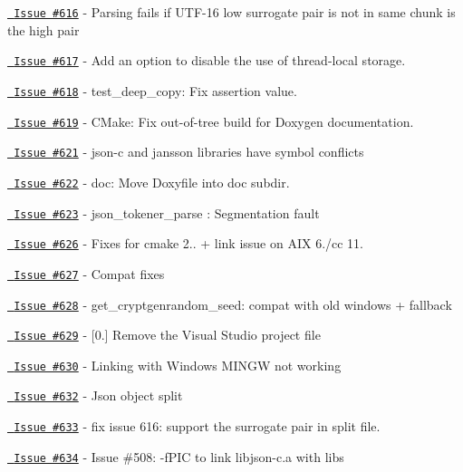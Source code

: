 \begin{DoxyItemize}
\item \href{https://github.com/json-c/json-c/issues/616}{\texttt{ Issue \#616}} -\/ Parsing fails if UTF-\/16 low surrogate pair is not in same chunk is the high pair
\item \href{https://github.com/json-c/json-c/issues/617}{\texttt{ Issue \#617}} -\/ Add an option to disable the use of thread-\/local storage.
\item \href{https://github.com/json-c/json-c/issues/618}{\texttt{ Issue \#618}} -\/ test\+\_\+deep\+\_\+copy\+: Fix assertion value.
\item \href{https://github.com/json-c/json-c/issues/619}{\texttt{ Issue \#619}} -\/ CMake\+: Fix out-\/of-\/tree build for Doxygen documentation.
\item \href{https://github.com/json-c/json-c/issues/621}{\texttt{ Issue \#621}} -\/ json-\/c and jansson libraries have symbol conflicts
\item \href{https://github.com/json-c/json-c/issues/622}{\texttt{ Issue \#622}} -\/ doc\+: Move Doxyfile into doc subdir.
\item \href{https://github.com/json-c/json-c/issues/623}{\texttt{ Issue \#623}} -\/ json\+\_\+tokener\+\_\+parse \+: Segmentation fault
\item \href{https://github.com/json-c/json-c/issues/626}{\texttt{ Issue \#626}} -\/ Fixes for cmake 2.. + link issue on AIX 6./cc 11.
\item \href{https://github.com/json-c/json-c/issues/627}{\texttt{ Issue \#627}} -\/ Compat fixes
\item \href{https://github.com/json-c/json-c/issues/628}{\texttt{ Issue \#628}} -\/ get\+\_\+cryptgenrandom\+\_\+seed\+: compat with old windows + fallback
\item \href{https://github.com/json-c/json-c/issues/629}{\texttt{ Issue \#629}} -\/ \mbox{[}0.\mbox{]} Remove the Visual Studio project file
\item \href{https://github.com/json-c/json-c/issues/630}{\texttt{ Issue \#630}} -\/ Linking with Windows MINGW not working
\item \href{https://github.com/json-c/json-c/issues/632}{\texttt{ Issue \#632}} -\/ Json object split
\item \href{https://github.com/json-c/json-c/issues/633}{\texttt{ Issue \#633}} -\/ fix issue 616\+: support the surrogate pair in split file.
\item \href{https://github.com/json-c/json-c/issues/634}{\texttt{ Issue \#634}} -\/ Issue \#508\+: {\ttfamily -\/f\+PIC} to link libjson-\/c.\+a with libs

\end{DoxyItemize}
